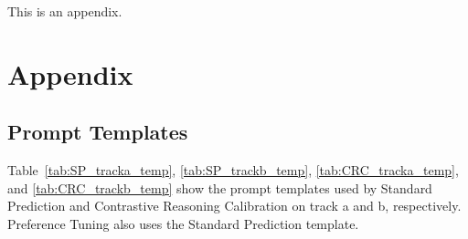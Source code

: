 \documentclass[11pt]{article}
\begin{document}
This is an appendix.

\fi

\section{Appendix}
\subsection{Prompt Templates}
\label{sec:app_PT}

Table~\ref{tab:SP_tracka_temp}, \ref{tab:SP_trackb_temp}, \ref{tab:CRC_tracka_temp}, and \ref{tab:CRC_trackb_temp} show the prompt templates used by Standard Prediction and Contrastive Reasoning Calibration on track a and b, respectively. Preference Tuning also uses the Standard Prediction template.
\end{document}
